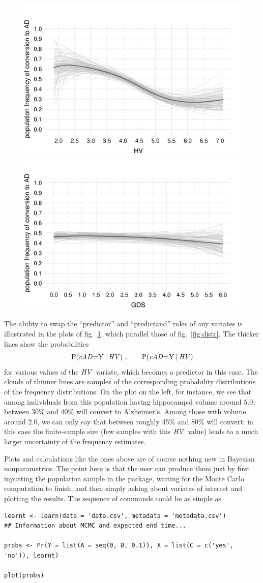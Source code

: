 \begin{figure}[t]
\centering%
\includegraphics[width=0.45\linewidth]{figures/prob_conversion_HV.pdf}\hfill%
\includegraphics[width=0.45\linewidth]{figures/prob_conversion_GDS.pdf}%
\\ \caption{}\label{fig:distr_inv}
\end{figure}
The ability to swap the ``predictor'' and ``predictand'' roles of any variates is illustrated in the plots of fig.~\ref{fig:distr_inv}, which parallel those of fig.~\ref{fig:distr}. The thicker lines show the probabilities
\begin{equation*}
    \P( \cAD \mo \yy \| \HV)\ ,\qquad
  \P( \cAD \mo \yy \| \HV)
\end{equation*}
for various values of the $\mathit{HV}$ variate, which becomes a predictor in this case. The clouds of thinner lines are samples of the corresponding probability distributions of the frequency distributions. On the plot on the left, for instance, we see that among individuals from this population having hippocampal volume around $5.0$, between 30\% and 40\% will convert to Alzheimer's. Among those with volume around $2.0$, we can only say that between roughly 45\% and 80\% will convert; in this case the finite-sample size (few samples with this $\mathit{HV}$ value) leads to a much larger uncertainty of the frequency estimates.

\medskip

Plots and calculations like the ones above are of course nothing new in Bayesian nonparametrics. The point here is that the user can produce them just by first inputting the population sample in the package, waiting for the Monte Carlo computation to finish, and then simply asking about variates of interest and plotting the results. The sequence of commands could be as simple as
\begin{verbatim}
learnt <- learn(data = 'data.csv', metadata = 'metadata.csv')
## Information about MCMC and expected end time...

probs <- Pr(Y = list(A = seq(0, 8, 0.1)), X = list(C = c('yes', 'no')), learnt)

plot(probs)
\end{verbatim}

